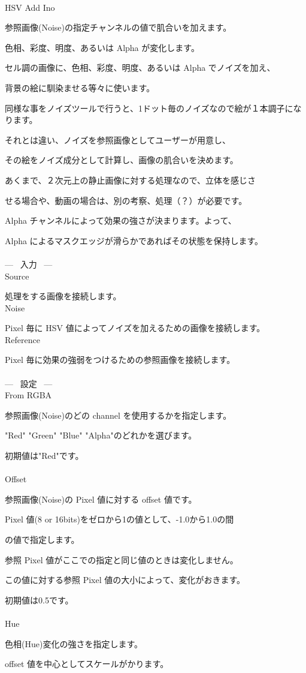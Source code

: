 \documentclass[a4paper,12pt]{article}
\begin{document}
\thispagestyle{empty}

\Large
\noindent \\
HSV Add Ino\medskip
\par
\normalsize
参照画像(Noise)の指定チャンネルの値で肌合いを加えます。\par
色相、彩度、明度、あるいは Alpha が変化します。\\
\par
セル調の画像に、色相、彩度、明度、あるいは Alpha でノイズを加え、\par
背景の絵に馴染ませる等々に使います。\par
同様な事をノイズツールで行うと、1ドット毎のノイズなので絵が１本調子になります。\par
それとは違い、ノイズを参照画像としてユーザーが用意し、\par
その絵をノイズ成分として計算し、画像の肌合いを決めます。\\
\par
あくまで、２次元上の静止画像に対する処理なので、立体を感じさ\par
せる場合や、動画の場合は、別の考察、処理（？）が必要です。\\
\par
Alpha チャンネルによって効果の強さが決まります。よって、\par
Alpha によるマスクエッジが滑らかであればその状態を保持します。\\
\\
--- \ 入力 \ ---\\
Source\par
処理をする画像を接続します。\\
Noise\par
Pixel 毎に HSV 値によってノイズを加えるための画像を接続します。\\
Reference\par
Pixel 毎に効果の強弱をつけるための参照画像を接続します。\\
\\
--- \ 設定 \ ---\\
From RGBA\par
参照画像(Noise)のどの channel を使用するかを指定します。\par
"Red" "Green" "Blue" "Alpha"のどれかを選びます。\par
初期値は"Red"です。\\
\\
Offset\par
参照画像(Noise)の Pixel 値に対する offset 値です。\par
Pixel 値(8 or 16bits)をゼロから1の値として、-1.0から1.0の間\par
の値で指定します。\par
参照 Pixel 値がここでの指定と同じ値のときは変化しません。\par
この値に対する参照 Pixel 値の大小によって、変化がおきます。\par
初期値は0.5です。\\
\\
Hue\par
色相(Hue)変化の強さを指定します。\par
offset 値を中心としてスケールがかります。
\end{document}
